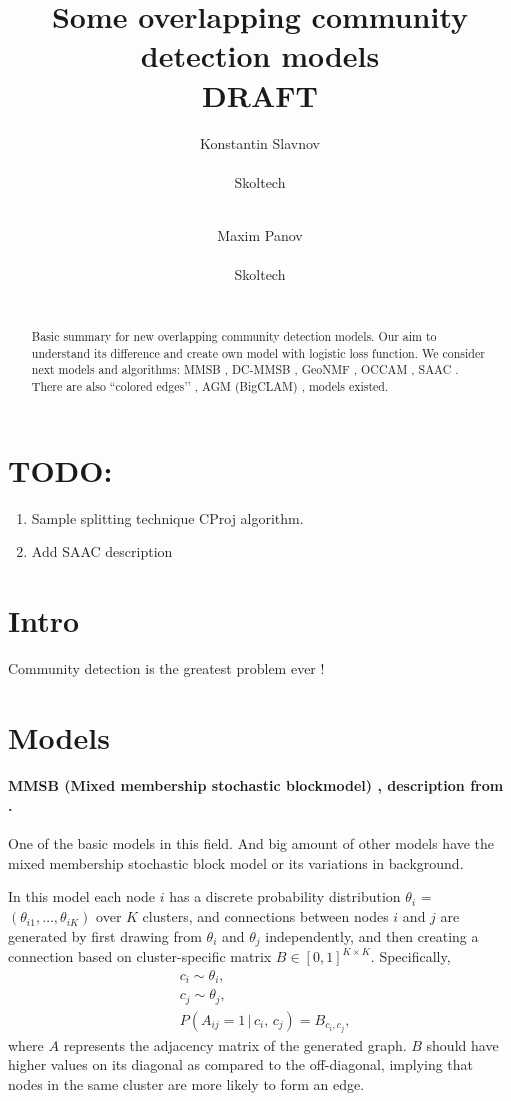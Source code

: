 \documentclass{ITaSconf}
\title{Some overlapping community detection models\\ {\color{red} DRAFT}}
\author{
	Konstantin Slavnov \\
	\begin{affiliation}
		Skoltech
	\end{affiliation}\\
	\email{k.slavnov@skoltech.ru}
	\and
	Maxim Panov \\
	\begin{affiliation}
		Skoltech
	\end{affiliation}\\
	\email{panov.maxim@gmail.com}
}
\begin{document}
	\maketitle
	
	\begin{abstract}
		Basic summary for new overlapping community detection models. 
		Our aim to understand its difference and create own model with logistic loss function.
		We consider next models and algorithms: MMSB \cite{airoldi2008MMSB}, DC-MMSB \cite{karrer2011DCMMSB}, GeoNMF \cite{mao201GeoNMF}, OCCAM \cite{zhang2014OCCAM}, SAAC \cite{kaufmann2015SAAC}.
		There are also ``colored edges’' \cite{ball2011efficient}, AGM (BigCLAM) \cite{yang2012community}, \cite{yang2013overlapping} models existed.
	\end{abstract}
	
	\section{\color{red}  TODO:}
	{\color{red}
		\begin{enumerate}
			\item Sample splitting technique CProj algorithm.
			\item Add SAAC description
		\end{enumerate}
	}
	\section{Intro}
	
	Community detection is the greatest problem ever \cite{Fortunato10}!
	
	\section{Models}
	
	\paragraph{MMSB (Mixed membership stochastic blockmodel) \cite{airoldi2008MMSB}, description from \cite{mao201GeoNMF}.}
	One of the basic models in this field. And big amount of other models have the mixed membership stochastic block model or its variations in background. 
	
	In this model each node $i$ has a discrete probability distribution $\theta_i$ = $(\theta_{i1}, \dots , \theta_{iK})$ over $K$ clusters, and connections between nodes $i$ and $j$ are generated by first drawing from $\theta_i$ and $\theta_j$	independently, and then creating a connection based on cluster-specific matrix $B \in [0, 1]^{K\times K}$. Specifically,
	\begin{align*}
	&c_i \sim \theta_i, \\
	&c_j \sim \theta_j, \\ 	
	&P(A_{ij} = 1 \,|\, c_{i} , \, c_{j}) = B_{c_{i} , c_{j}},
	\end{align*}
	where $A$ represents the adjacency matrix of the generated graph. $B$ should have higher values on its diagonal as compared to the off-diagonal, implying that nodes in the same cluster are more likely to form an edge. 
	
\end{document}
